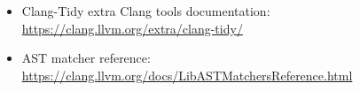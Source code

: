 
\begin{itemize}
\item
Clang-Tidy extra Clang tools documentation: \url{https://clang.llvm.org/extra/clang-tidy/}

\item
AST matcher reference: \url{https://clang.llvm.org/docs/LibASTMatchersReference.html}
\end{itemize}

